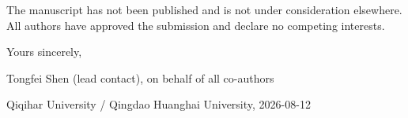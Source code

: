 The manuscript has not been published and is not under consideration elsewhere. All authors have approved the submission and declare no competing interests.

Yours sincerely,

\medskip

\noindent Tongfei Shen (lead contact), on behalf of all co-authors

\medskip

\noindent Qiqihar University / Qingdao Huanghai University, 2026-08-12
